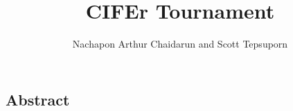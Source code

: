 \documentclass[letterpaper,12pt]{article}
\begin{document}
\title{\vspace{-0.5in}CIFEr Tournament}
\author{Nachapon Arthur Chaidarun and Scott Tepsuporn}
\renewcommand{\today}{December 1, 2013}
\maketitle
\thispagestyle{empty}
\pagestyle{empty}

\subsection*{Abstract}

\end{document}
